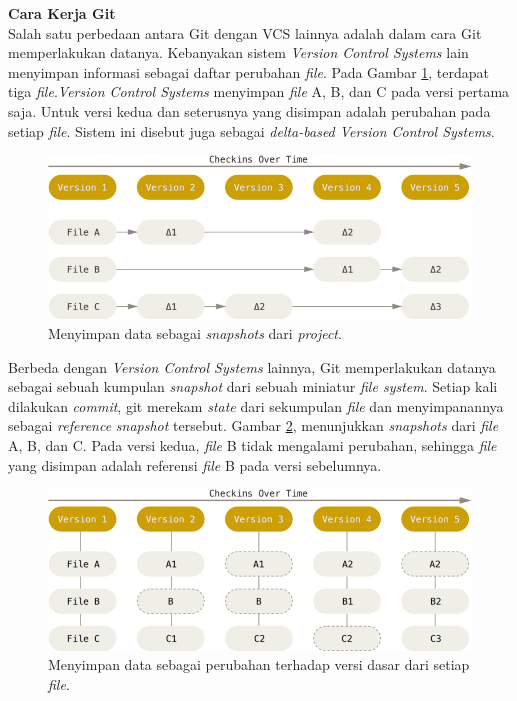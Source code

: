 \documentclass[a4paper,twoside]{article}
\begin{document}
\begin{enumerate}
\textbf{Cara Kerja Git}\\
Salah satu perbedaan antara Git dengan VCS lainnya adalah dalam cara Git memperlakukan datanya. Kebanyakan sistem \textit{Version Control Systems} lain menyimpan informasi sebagai daftar perubahan \textit{file}. Pada Gambar \ref{fig:deltas}, terdapat tiga \textit{file}.\textit{Version Control Systems} menyimpan \textit{file} A, B, dan C pada versi pertama saja. Untuk versi kedua dan seterusnya yang disimpan adalah perubahan pada setiap \textit{file}. Sistem ini disebut juga sebagai \textit{delta-based Version Control Systems}. 
\begin{figure}[H]
	\centering
		\includegraphics[scale=0.5]{Gambar/deltas.png}
	\caption{Menyimpan data sebagai \textit{snapshots} dari \textit{project}\cite{chacon2014pro}.}
	\label{fig:deltas}
\end{figure}


Berbeda dengan \textit{Version Control Systems} lainnya, Git memperlakukan datanya sebagai sebuah kumpulan \textit{snapshot} dari sebuah miniatur \textit{file system}. Setiap kali dilakukan \textit{commit}, git merekam \textit{state} dari sekumpulan \textit{file} dan menyimpanannya sebagai \textit{reference} \textit{snapshot} tersebut. Gambar \ref{fig:snapshots}, menunjukkan \textit{snapshots} dari \textit{file} A, B, dan C. Pada versi kedua, \textit{file} B tidak mengalami perubahan, sehingga \textit{file} yang disimpan adalah referensi \textit{file} B pada versi sebelumnya.
\begin{figure}[H]
	\centering
		\includegraphics[scale=0.5]{Gambar/snapshots.png}
	\caption{Menyimpan data sebagai perubahan terhadap versi dasar dari setiap \textit{file}\cite{chacon2014pro}.}
	\label{fig:snapshots}
\end{figure}


\end{enumerate}
\end{document}
